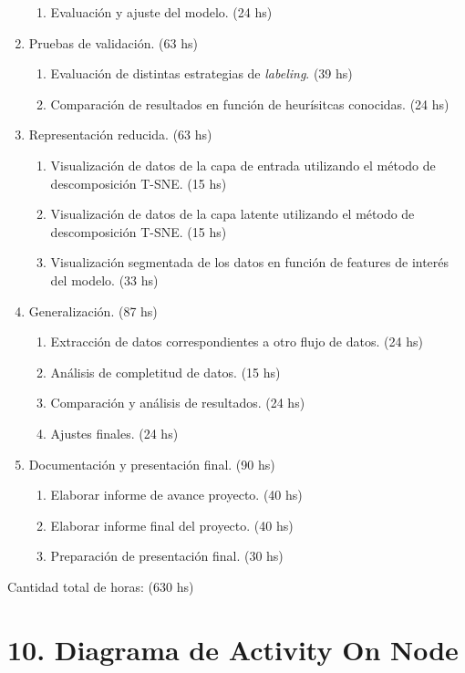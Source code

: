 \documentclass[
11pt, %
]{charter}
\begin{document}
\begin{enumerate}
\begin{enumerate}
		\item Evaluación y ajuste del modelo. (24 hs)
	\end{enumerate}
\item Pruebas de validación. (63 hs)
	\begin{enumerate}
		\item Evaluación de distintas estrategias de \emph{labeling}. (39 hs)
		\item Comparación de resultados en función de heurísitcas conocidas. (24 hs)
	\end{enumerate}
\item Representación reducida. (63 hs)
	\begin{enumerate}
 		\item Visualización de datos de la capa de entrada utilizando el método de descomposición T-SNE. (15 hs)
 		\item Visualización de datos de la capa latente utilizando el método de descomposición T-SNE. (15 hs)
 		\item Visualización segmentada de los datos en función de features de interés del modelo. (33 hs)
 	\end{enumerate}
\item Generalización. (87 hs)
 	\begin{enumerate}
 		\item Extracción de datos correspondientes a otro flujo de datos. (24 hs)
 		\item Análisis de completitud de datos. (15 hs)
 		\item Comparación y análisis de resultados. (24 hs)
 		\item Ajustes finales. (24 hs)
 	\end{enumerate}
\item Documentación y presentación final. (90 hs)
 	\begin{enumerate}
 		\item Elaborar informe de avance proyecto. (40 hs)
 		\item Elaborar informe final del proyecto. (40 hs)
 		\item Preparación de presentación final. (30 hs)
 	\end{enumerate}
\end{enumerate}

Cantidad total de horas: (630 hs)

\section{10. Diagrama de Activity On Node}
\label{sec:AoN}
\end{document}
